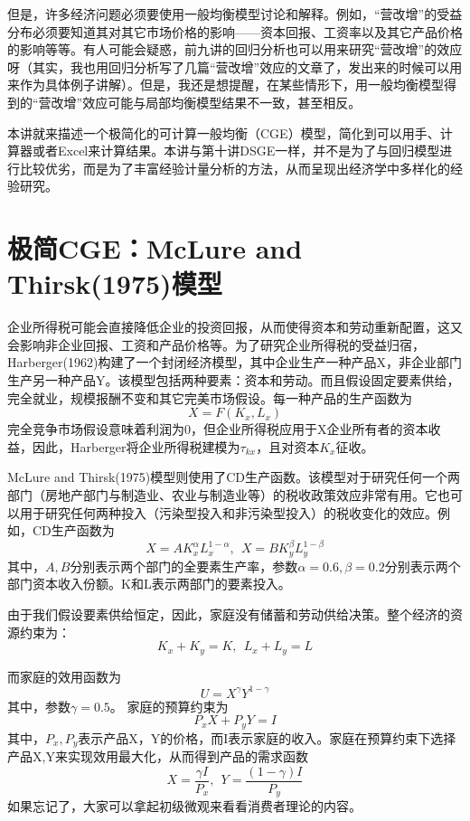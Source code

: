 \documentclass[cn,12pt,math=newtx,citestyle=gb7714-2015,bibstyle=gb7714-2015]{elegantbook}
\begin{document}
	但是，许多经济问题必须要使用一般均衡模型讨论和解释。例如，“营改增”的受益分布必须要知道其对其它市场价格的影响——资本回报、工资率以及其它产品价格的影响等等。有人可能会疑惑，前九讲的回归分析也可以用来研究“营改增”的效应呀（其实，我也用回归分析写了几篇“营改增”效应的文章了，发出来的时候可以用来作为具体例子讲解）。但是，我还是想提醒，在某些情形下，用一般均衡模型得到的“营改增”效应可能与局部均衡模型结果不一致，甚至相反。
	
	本讲就来描述一个极简化的可计算一般均衡（CGE）模型，简化到可以用手、计算器或者Excel来计算结果。本讲与第十讲DSGE一样，并不是为了与回归模型进行比较优劣，而是为了丰富经验计量分析的方法，从而呈现出经济学中多样化的经验研究。
	
	\section{极简CGE：McLure and Thirsk(1975)模型}
	企业所得税可能会直接降低企业的投资回报，从而使得资本和劳动重新配置，这又会影响非企业回报、工资和产品价格等。为了研究企业所得税的受益归宿，Harberger(1962)构建了一个封闭经济模型，其中企业生产一种产品X，非企业部门生产另一种产品Y。该模型包括两种要素：资本和劳动。而且假设固定要素供给，完全就业，规模报酬不变和其它完美市场假设。每一种产品的生产函数为
	$$X=F(K_x,L_x)$$
	完全竞争市场假设意味着利润为0，但企业所得税应用于X企业所有者的资本收益，因此，Harberger将企业所得税建模为$\tau_{kx}$，且对资本$K_x$征收。
	
	McLure and Thirsk(1975)模型则使用了CD生产函数。该模型对于研究任何一个两部门（房地产部门与制造业、农业与制造业等）的税收政策效应非常有用。它也可以用于研究任何两种投入（污染型投入和非污染型投入）的税收变化的效应。例如，CD生产函数为
	\begin{equation}
		X=AK_x^\alpha L_x^{1-\alpha},~~X=BK_y^\beta L_y^{1-\beta}
	\end{equation}
	其中，$A,B$分别表示两个部门的全要素生产率，参数$\alpha=0.6,\beta=0.2$分别表示两个部门资本收入份额。K和L表示两部门的要素投入。
	
	由于我们假设要素供给恒定，因此，家庭没有储蓄和劳动供给决策。整个经济的资源约束为：
	\begin{equation}
		K_x+K_y=K,~~L_x+L_y=L
	\end{equation}
	
	而家庭的效用函数为
	\begin{equation}
		U=X^\gamma Y^{1-\gamma}
	\end{equation}
	其中，参数$\gamma=0.5$。
	家庭的预算约束为
	\begin{equation}
		P_xX+P_yY=I
	\end{equation}
	其中，$P_x,P_y$表示产品X，Y的价格，而I表示家庭的收入。家庭在预算约束下选择产品X,Y来实现效用最大化，从而得到产品的需求函数
	\begin{equation}
		X=\frac{\gamma I}{P_x},~~Y=\frac{(1-\gamma) I}{P_y}
	\end{equation}
	如果忘记了，大家可以拿起初级微观来看看消费者理论的内容。
	
\end{document}
